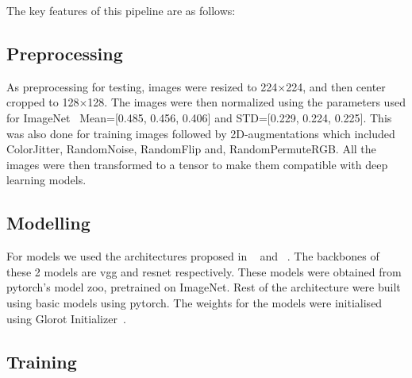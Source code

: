 The key features of this pipeline are as follows:

\subsection{Preprocessing}\label{subsec:preprocessing}
As preprocessing for testing, images were resized to 224$\times$224, and then center cropped to 128$\times$128.
The images were then normalized using the parameters used for ImageNet~\cite{Deng2009ImageNetAL} Mean=[0.485, 0.456, 0.406] and STD=[0.229, 0.224, 0.225].
This was also done for training images followed by 2D-augmentations which included ColorJitter, RandomNoise, RandomFlip and, RandomPermuteRGB.
All the images were then transformed to a tensor to make them compatible with deep learning models.

\subsection{Modelling}\label{subsec:modelling}
For models we used the architectures proposed in ~\cite{Xie_2019} and ~\cite{Xie_2020}.
The backbones of these 2 models are \gls{vgg} and \gls{resnet} respectively.
These models were obtained from pytorch's model zoo, pretrained on ImageNet.
Rest of the architecture were built using basic models using pytorch.
The weights for the models were initialised using Glorot Initializer~\cite{Glorot2010UnderstandingTD}.

\subsection{Training}\label{subsec:training}

